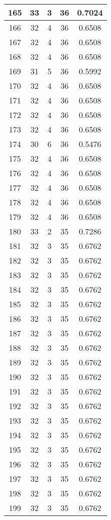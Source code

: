 \documentclass[letterpaper, 12pt]{article}
\begin{document}
\begin{longtable}{|c|c|c|c|c|}
\hline
165 & 33 & 3 & 36 & 0.7024 \\
\hline
166 & 32 & 4 & 36 & 0.6508 \\
\hline
167 & 32 & 4 & 36 & 0.6508 \\
\hline
168 & 32 & 4 & 36 & 0.6508 \\
\hline
169 & 31 & 5 & 36 & 0.5992 \\
\hline
170 & 32 & 4 & 36 & 0.6508 \\
\hline
171 & 32 & 4 & 36 & 0.6508 \\
\hline
172 & 32 & 4 & 36 & 0.6508 \\
\hline
173 & 32 & 4 & 36 & 0.6508 \\
\hline
174 & 30 & 6 & 36 & 0.5476 \\
\hline
175 & 32 & 4 & 36 & 0.6508 \\
\hline
176 & 32 & 4 & 36 & 0.6508 \\
\hline
177 & 32 & 4 & 36 & 0.6508 \\
\hline
178 & 32 & 4 & 36 & 0.6508 \\
\hline
179 & 32 & 4 & 36 & 0.6508 \\
\hline
180 & 33 & 2 & 35 & 0.7286 \\
\hline
181 & 32 & 3 & 35 & 0.6762 \\
\hline
182 & 32 & 3 & 35 & 0.6762 \\
\hline
183 & 32 & 3 & 35 & 0.6762 \\
\hline
184 & 32 & 3 & 35 & 0.6762 \\
\hline
185 & 32 & 3 & 35 & 0.6762 \\
\hline
186 & 32 & 3 & 35 & 0.6762 \\
\hline
187 & 32 & 3 & 35 & 0.6762 \\
\hline
188 & 32 & 3 & 35 & 0.6762 \\
\hline
189 & 32 & 3 & 35 & 0.6762 \\
\hline
190 & 32 & 3 & 35 & 0.6762 \\
\hline
191 & 32 & 3 & 35 & 0.6762 \\
\hline
192 & 32 & 3 & 35 & 0.6762 \\
\hline
193 & 32 & 3 & 35 & 0.6762 \\
\hline
194 & 32 & 3 & 35 & 0.6762 \\
\hline
195 & 32 & 3 & 35 & 0.6762 \\
\hline
196 & 32 & 3 & 35 & 0.6762 \\
\hline
197 & 32 & 3 & 35 & 0.6762 \\
\hline
198 & 32 & 3 & 35 & 0.6762 \\
\hline
199 & 32 & 3 & 35 & 0.6762 \\
\hline
\end{longtable}
\end{document}
